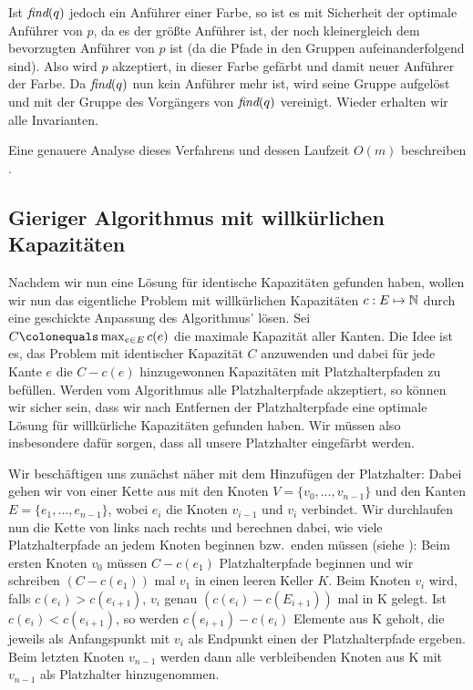 Ist $\text{\em find}(q)$ jedoch ein Anführer einer Farbe, so ist es mit Sicherheit der optimale Anführer von $p$, da es der größte
Anführer ist, der noch kleinergleich dem bevorzugten Anführer von $p$ ist (da die Pfade in den Gruppen
aufeinanderfolgend sind).
Also wird $p$ akzeptiert, in dieser Farbe gefärbt und damit neuer Anführer der Farbe.
Da $\text{\em find}(q)$ nun kein Anführer mehr ist, wird seine Gruppe aufgelöst und mit der Gruppe des Vorgängers von $\text{\em find}(q)$
vereinigt.
Wieder erhalten wir alle Invarianten.

Eine genauere Analyse dieses Verfahrens und dessen Laufzeit $O(m)$ beschreiben .

\subsection{Gieriger Algorithmus mit willkürlichen Kapazitäten}\label{subsec:anpassenAnWillkürlicheKapazitäten}

Nachdem wir nun eine Lösung für identische Kapazitäten gefunden haben, wollen wir nun das eigentliche Problem mit
willkürlichen Kapazitäten $c: E \mapsto \mathbb N$ durch eine geschickte Anpassung des Algorithmus' lösen.
Sei $C \colonequals \max_{e \in E} c(e)$ die maximale Kapazität aller Kanten.
Die Idee ist es, das Problem mit identischer Kapazität $C$ anzuwenden und dabei für jede Kante $e$ die $C - c(e)$
hinzugewonnen Kapazitäten mit Platzhalterpfaden zu befüllen.
Werden vom Algorithmus alle Platzhalterpfade akzeptiert, so können wir sicher sein, dass wir nach Entfernen der
Platzhalterpfade eine optimale Lösung für willkürliche Kapazitäten gefunden haben.
Wir müssen also insbesondere dafür sorgen, dass all unsere Platzhalter eingefärbt werden.

Wir beschäftigen uns zunächst näher mit dem Hinzufügen der Platzhalter:
Dabei gehen wir von einer Kette aus mit den Knoten $V=\{v_0,\dots,v_{n-1}\}$ und den Kanten
$E=\{e_1,\dots,e_{n-1}\}$, wobei $e_i$ die Knoten $v_{i-1}$ und $v_i$ verbindet.
Wir durchlaufen nun die Kette von links nach rechts und berechnen dabei, wie viele Platzhalterpfade an jedem Knoten
beginnen bzw.\ enden müssen (siehe ):
Beim ersten Knoten $v_0$ müssen $C - c(e_1)$ Platzhalterpfade beginnen und wir schreiben $(C - c(e_1))$ mal $v_1$ in einen
leeren Keller $K$.
Beim Knoten $v_i$ wird, falls $c(e_i) > c(e_{i+1})$, $v_i$ genau $(c(e_i) - c(E_{i+1}))$ mal in K gelegt.
Ist $c(e_i) < c(e_{i+1})$, so werden $c(e_{i+1}) - c(e_i)$ Elemente aus K geholt, die jeweils als Anfangspunkt mit $v_i$
als Endpunkt einen der Platzhalterpfade ergeben.
Beim letzten Knoten $v_{n-1}$ werden dann alle verbleibenden Knoten aus K mit $v_{n-1}$ als Platzhalter hinzugenommen.

